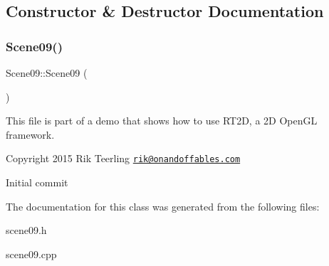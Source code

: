 \subsection{Constructor \& Destructor Documentation}
\mbox{\label{class_scene09_a983b7890f9713f0c5f1e0aaa4e294e65}} 
\subsubsection{\texorpdfstring{Scene09()}{Scene09()}}
{\footnotesize\ttfamily Scene09\+::\+Scene09 (\begin{DoxyParamCaption}{ }\end{DoxyParamCaption})}

This file is part of a demo that shows how to use R\+T2D, a 2D Open\+GL framework.


\begin{DoxyItemize}
\item Copyright 2015 Rik Teerling \href{mailto:rik@onandoffables.com}{\tt rik@onandoffables.\+com}
\begin{DoxyItemize}
\item Initial commit 
\end{DoxyItemize}
\end{DoxyItemize}

The documentation for this class was generated from the following files\+:\begin{DoxyCompactItemize}
\item 
scene09.\+h\item 
scene09.\+cpp\end{DoxyCompactItemize}

